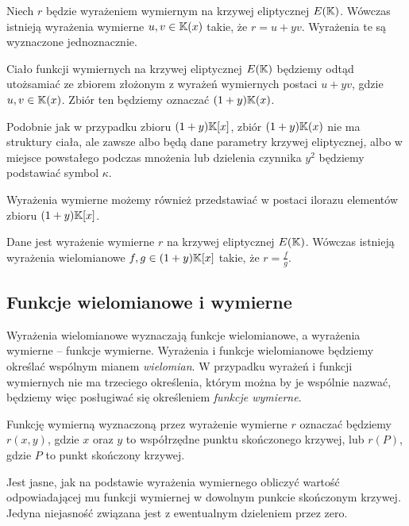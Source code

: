 \begin{theorem}
Niech $r$ będzie wyrażeniem wymiernym na krzywej eliptycznej $E(\mathbb{K})$.
Wówczas istnieją wyrażenia wymierne $u, v \in \mathbb{K}(x)$ takie,
że $r = u + yv$.
Wyrażenia te są wyznaczone jednoznacznie.
\end{theorem}

\begin{remark}
Ciało funkcji wymiernych na krzywej eliptycznej $E(\mathbb{K})$
będziemy odtąd utożsamiać ze zbiorem
złożonym z wyrażeń wymiernych postaci $u + yv$,
gdzie $u,v \in \mathbb{K}(x)$.
Zbiór ten będziemy oznaczać $(1 + y)\mathbb{K}(x)$.
\end{remark}

Podobnie jak w przypadku zbioru $(1 + y)\mathbb{K}[x]$,
zbiór $(1 + y)\mathbb{K}(x)$ nie ma struktury ciała,
ale zawsze albo będą dane parametry krzywej eliptycznej,
albo w miejsce powstałego podczas mnożenia lub dzielenia czynnika $y^2$
będziemy podstawiać symbol $\kappa$.

Wyrażenia wymierne możemy również przedstawiać w postaci ilorazu
elementów zbioru $(1 + y)\mathbb{K}[x]$.

\begin{theorem}
Dane jest wyrażenie wymierne $r$ na krzywej eliptycznej $E(\mathbb{K})$.
Wówczas istnieją wyrażenia wielomianowe $f, g \in (1 + y)\mathbb{K}[x]$ takie,
że $r = \frac{f}{g}$.
\end{theorem}

\subsection*{Funkcje wielomianowe i wymierne}

Wyrażenia wielomianowe wyznaczają funkcje wielomianowe,
a wyrażenia wymierne -- funkcje wymierne.
Wyrażenia i funkcje wielomianowe będziemy określać
wspólnym mianem \emph{wielomian}.
W przypadku wyrażeń i funkcji wymiernych nie ma trzeciego określenia,
którym można by je wspólnie nazwać,
będziemy więc posługiwać się określeniem \emph{funkcje wymierne}.

\begin{remark}
Funkcję wymierną wyznaczoną przez wyrażenie wymierne $r$
oznaczać będziemy $r(x, y)$,
gdzie $x$ oraz $y$ to współrzędne punktu skończonego krzywej,
lub $r(P)$, gdzie $P$ to punkt skończony krzywej.
\end{remark}

Jest jasne, jak na podstawie wyrażenia wymiernego
obliczyć wartość odpowiadającej mu funkcji wymiernej
w dowolnym punkcie skończonym krzywej.
Jedyna niejasność związana jest z ewentualnym dzieleniem przez zero.

